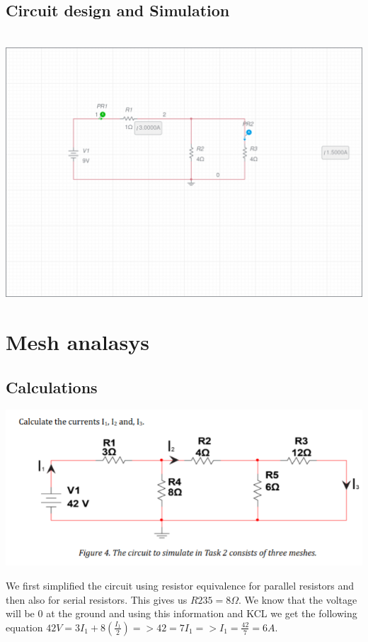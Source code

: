 \documentclass[11pt]{article}
\begin{document}
\subsection[25pt]{\bf{Circuit design and Simulation}}

\noindent
\\
\includegraphics[width=\linewidth]{circuits/Lab 1 Task 1-schematic.png}


\section{\bf{Mesh analasys}}

\subsection[25pt]{\bf{Calculations}}

\includegraphics[width=\linewidth]{2.1 calculations.png}


\noindent
We first simplified the circuit using resistor equivalence for parallel resistors and then also for serial resistors.
This gives us $R235 = 8\Omega$. We know that the voltage will be $0$ at the ground and using this information and KCL we 
get the following equation $42V = 3I_{1} + 8(\frac{I_{1}}{2}) => 42 = 7I_{1} => I_{1} = \frac{42}{7} = 6A$.
\end{document}
